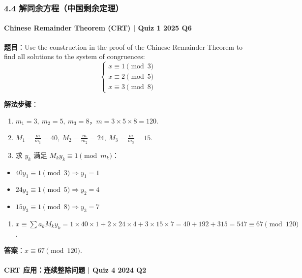 \documentclass[10pt,a4paper,openany]{ctexbook}
\theoremstyle{definition}
\theoremstyle{remark}
\begin{document}
\vspace{-2pt}

\subsubsection{4.4 解同余方程（中国剩余定理）}

\paragraph{Chinese Remainder Theorem (CRT) | Quiz 1 2025 Q6}

\textbf{题目}：Use the construction in the proof of the Chinese Remainder Theorem to find all solutions to the system of congruences:
\[
\begin{cases}
x \equiv 1 \pmod{3} \\
x \equiv 2 \pmod{5} \\
x \equiv 3 \pmod{8}
\end{cases}
\]

\textbf{解法步骤}：
\begin{enumerate}
\item $m_1 = 3,\ m_2 = 5,\ m_3 = 8$，$m = 3 \times 5 \times 8 = 120$.
\item $M_1 = \frac{m}{m_1} = 40,\ M_2 = \frac{m}{m_2} = 24,\ M_3 = \frac{m}{m_3} = 15$.
\item 求 $y_k$ 满足 $M_k y_k \equiv 1 \pmod{m_k}$：
\end{enumerate}

\begin{itemize}
\item $40 y_1 \equiv 1 \pmod{3} \Rightarrow y_1 = 1$
\item $24 y_2 \equiv 1 \pmod{5} \Rightarrow y_2 = 4$
\item $15 y_3 \equiv 1 \pmod{8} \Rightarrow y_3 = 7$
\end{itemize}

\begin{enumerate}
\item $x \equiv \sum a_k M_k y_k = 1 \times 40 \times 1 + 2 \times 24 \times 4 + 3 \times 15 \times 7 = 40 + 192 + 315 = 547 \equiv 67 \pmod{120}$.

\end{enumerate}

\textbf{答案}：$x \equiv 67 \pmod{120}$.
\vspace{-2pt}

\paragraph{CRT 应用：连续整除问题 | Quiz 4 2024 Q2}
\end{document}
